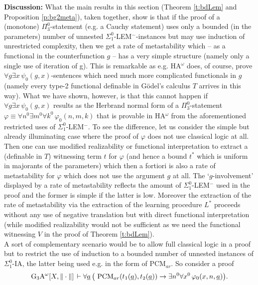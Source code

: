 {\bf Discussion:} What the main results in this section (Theorem 
\ref{t:bdLem} and Proposition \ref{p:bg2meta}), taken together, show 
is that if the proof of a (monotone) $\Pi^0_3$-statement (e.g. a 
Cauchy statement) uses only a bounded (in the 
parameters) number of unnested 
$\Sigma^0_1$-LEM$^-$-instances but may use induction 
of unrestricted complexity, then we get a rate of metastability which 
-- as a functional in the counterfunction $g$ -- has a very simple structure 
(namely only a single use of iteration of g). This is remarkable as e.g. 
HA$^{\omega}$ does, of course, 
prove $\forall g \exists x\,\psi_0(g,x)$-sentences 
which need 
much more complicated functionals in $g$ (namely every type-2 functional
definable in G\"odel's calculus $T$ arrives in this way). What we have shown, 
however, is that this cannot happen if $\forall g \exists x\,\psi_0(g,x)$
results as the Herbrand normal form of a $\Pi^0_3$-statement 
$\varphi\equiv \forall n^0\exists m^0\forall k^0\,\varphi_0(n,m,k)$ 
that is provable 
in HA$^{\omega}$ from the aforementioned restricted uses of 
$\Sigma^0_1$-LEM$^-.$ To see the difference, 
let us consider the simple but already illuminating 
case where the proof of $\varphi$ does not use classical logic 
at all. Then one can use modified realizability or functional interpretation 
to extract a (definable in $T$) witnessing term $t$ for $\varphi$ 
(and hence a bound $t^*$ which is uniform in majorants of the parameters) 
which then a fortiori is also a rate of metastability for $\varphi$ 
which does not use the argument $g$ at all.
The `$g$-involvement' displayed by a rate of metastability reflects the 
amount of $\Sigma^0_1$-LEM$^-$ used in the proof and the former 
is simple if the latter is low. Moreover the extraction of the rate of 
metastability via the extraction of the learning procedure $L^*$ proceeds 
without any use of negative translation but with direct functional 
interpretation (while modified realizability would not be sufficient as 
we need the functional witnessing $V$ in the proof of Theorem 
\ref{t:bdLem}).
\\[2mm] 
A sort of complementary scenario would be to allow full classical logic 
in a proof but to restrict the use of induction to a bounded number of 
unnested instances of $\Sigma^0_1$-IA, the latter being used e.g. in 
the form of PCM$_{ar}.$ So consider a proof 
\[\mbox{\rm G$_3$A}^{\omega}[X,\|\cdot\|]\,
\vdash   
\forall \underline{a}\, \big( 
\ \mbox{\rm PCM}_{ar}(t_1(\underline{a}),
t_2(\underline{a}))
 \rightarrow \exists n^0\forall x^0\,\varphi_0(x,n,\underline{a})\big).  \] 
